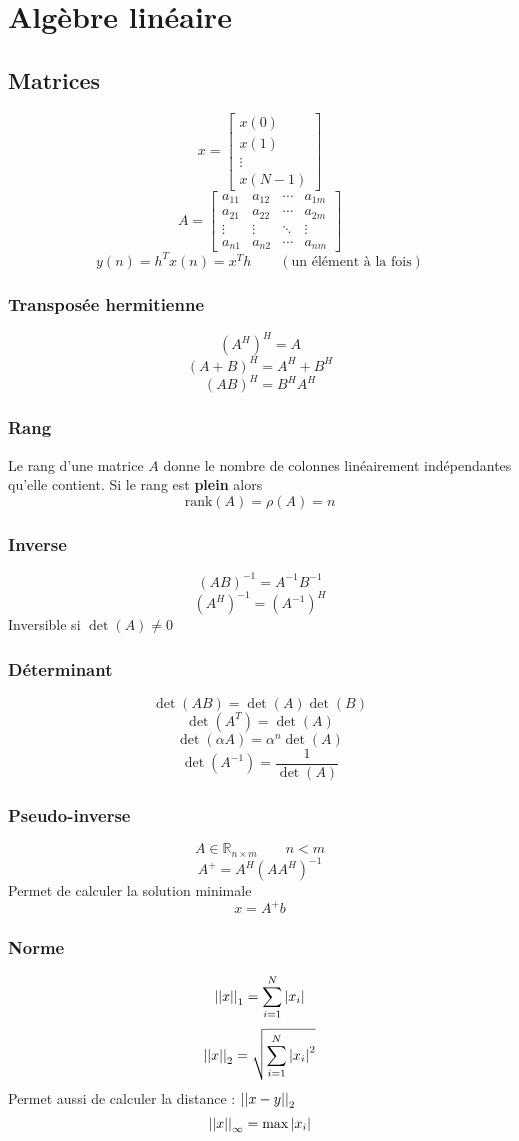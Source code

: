 \documentclass[resume]{subfiles}
\begin{document}
\section{Algèbre linéaire}
\subsection{Matrices}
$$x=\begin{bmatrix}
x(0)\\x(1)\\\vdots\\x(N-1)
\end{bmatrix}$$
$$A=\begin{bmatrix}
a_{11} & a_{12} & \cdots & a_{1m}\\
a_{21} & a_{22} & \cdots & a_{2m}\\
\vdots & \vdots & \ddots & \vdots\\
a_{n1} & a_{n2} & \cdots & a_{nm}
\end{bmatrix}$$
$$y(n)=h^Tx(n)=x^Th\qquad (\text{un élément à la fois})$$
\subsubsection{Transposée hermitienne}
$$\left(A^{H}\right)^{H}=A$$
$$(A+B)^{H}=A^H+B^H$$
$$(AB)^H=B^HA^H$$
\subsubsection{Rang}
Le rang d'une matrice $A$ donne le nombre de colonnes linéairement indépendantes qu'elle contient. Si le rang est \textbf{plein} alors
$$\text{rank}(A)=\rho(A)=n$$
\subsubsection{Inverse}
$$(AB)^{-1}=A^{-1}B^{-1}$$
$$(A^{H})^{-1}=(A^{-1})^{H}$$
Inversible si $\det(A)\neq 0$
\subsubsection{Déterminant}
$$\det(AB)=\det(A)\det(B)$$
$$\det(A^{T})=\det(A)$$
$$\det(\alpha A)=\alpha^{n}\det(A)$$
$$\det(A^{-1})=\frac{1}{\det(A)}$$
\subsubsection{Pseudo-inverse}
$$A\in \mathbb{R}_{n\times m}\qquad n<m$$
$$A^{+}=A^{H}(AA^{H})^{-1}$$
Permet de calculer la solution minimale
$$x=A^{+}b$$
\subsubsection{Norme}
$$\abs{\abs{x}}_1=\sum_{i=1}^{N}\abs{x_i}$$
$$\abs{\abs{x}}_2=\sqrt{\sum_{i=1}^{N}\abs{x_i}^2}$$
Permet aussi de calculer la distance : $\abs{\abs{x-y}}_2$
$$\abs{\abs{x}}_{\infty}=\max\abs{x_i}$$
\end{document}
